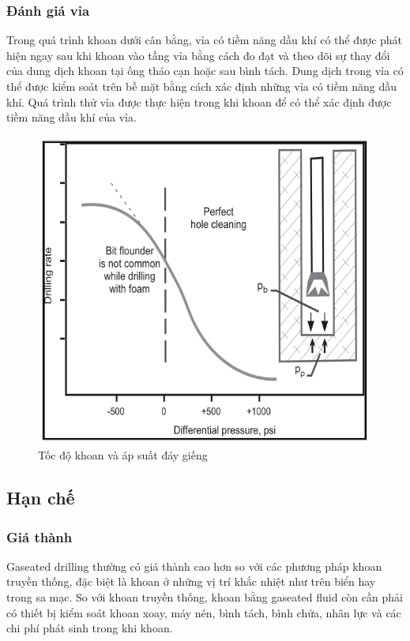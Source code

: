 \documentclass[13pt,a4paper]{article}
\begin{document}
	\subsubsection{Đánh giá vỉa}
	Trong quá trình khoan dưới cân bằng, vỉa có tiềm năng dầu khí có thể được phát hiện ngay sau khi khoan vào tầng vỉa bằng cách đo đạt và theo dõi sự thay đổi của dung dịch khoan tại ống tháo cạn hoặc sau bình tách. Dung dịch trong vỉa có thể được kiểm soát trên bề mặt bằng cách xác định những vỉa có tiềm năng dầu khí. Quá trình thử vỉa được thực hiện trong khi khoan để có thể xác định được tiềm năng dầu khí của vỉa.
	\begin{figure}[h]
		\centering
		\includegraphics[scale=0.5]{Figs/Fig11.PNG}
		\caption{Tốc độ khoan và áp suất đáy giếng}
	\end{figure}
\subsection{Hạn chế}
	\subsubsection{Giá thành}
	Gaseated drilling thường có giá thành cao hơn so với các phương pháp khoan truyền thống, đặc biệt là khoan ở những vị trí khắc nhiệt như trên biển hay trong sa mạc. So với khoan truyền thống, khoan bằng gaseated fluid còn cần phải có thiết bị kiểm soát khoan xoay, máy nén, bình tách, bình chứa, nhân lực và các chi phí phát sinh trong khi khoan. 
\end{document}
